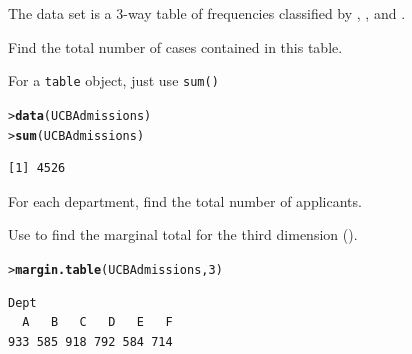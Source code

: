 \documentclass[11pt]{report}\usepackage[]{graphicx}\usepackage[]{color}
\makeatletter
\newcommand{\hlnum}[1]{\textcolor[rgb]{0.686,0.059,0.569}{#1}}%
\newcommand{\hlstd}[1]{\textcolor[rgb]{0.345,0.345,0.345}{#1}}%
\newcommand{\hlkwd}[1]{\textcolor[rgb]{0.737,0.353,0.396}{\textbf{#1}}}%
\newenvironment{kframe}{%
 \def\at@end@of@kframe{}%
 \ifinner\ifhmode%
  \def\at@end@of@kframe{\end{minipage}}%
  \begin{minipage}{\columnwidth}%
 \fi\fi%
 \def\FrameCommand##1{\hskip\@totalleftmargin \hskip-\fboxsep
 \colorbox{shadecolor}{##1}\hskip-\fboxsep
     \hskip-\linewidth \hskip-\@totalleftmargin \hskip\columnwidth}%
 \MakeFramed {\advance\hsize-\width
   \@totalleftmargin\z@ \linewidth\hsize
   \@setminipage}}%
 {\par\unskip\endMakeFramed%
 \at@end@of@kframe}
\newenvironment{knitrout}{}{} %
\renewenvironment{knitrout}{\small\renewcommand{\baselinestretch}{.85}}{} %
\makeatother
\begin{document}
\begin{Exercises}
\exercise The data set  is a 3-way table of frequencies
classified by , , and .
  \begin{enumerate*}
    \item Find the total number of cases contained in this table.
    \begin{ans}
      For a \texttt{table} object, just use \texttt{sum()}
\begin{knitrout}
\color{fgcolor}\begin{kframe}
\begin{alltt}
\hlstd{> }\hlkwd{data}\hlstd{(UCBAdmissions)}
\hlstd{> }\hlkwd{sum}\hlstd{(UCBAdmissions)}
\end{alltt}
\begin{verbatim}
[1] 4526
\end{verbatim}
\end{kframe}
\end{knitrout}
    \end{ans}
        
    \item For each department, find the total number of applicants.
    \begin{ans}
      Use  to find the marginal total for the third dimension ().
\begin{knitrout}
\color{fgcolor}\begin{kframe}
\begin{alltt}
\hlstd{> }\hlkwd{margin.table}\hlstd{(UCBAdmissions,} \hlnum{3}\hlstd{)}
\end{alltt}
\begin{verbatim}
Dept
  A   B   C   D   E   F 
933 585 918 792 584 714 
\end{verbatim}
\end{kframe}
\end{knitrout}

    \end{ans}
        

\end{enumerate*}
\end{Exercises}
\end{document}
